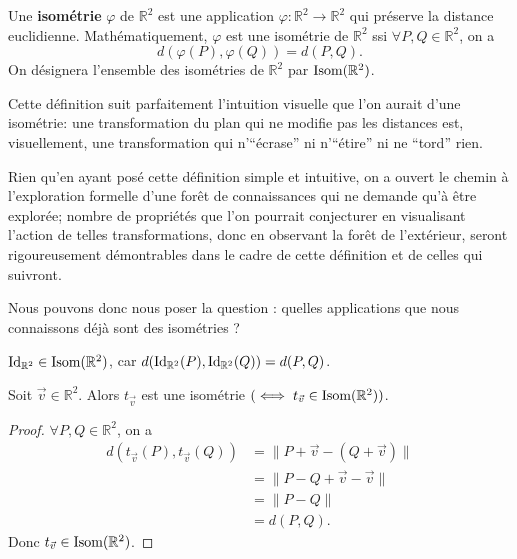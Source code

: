 \documentclass{book}
\numberwithin{equation}{section}
\renewcommand{\phi}{\varphi}
\providecommand{\plan}{{\mathbb R^2}}
\providecommand{\id}{{\textnormal{Id}}}
\providecommand{\IdR}{{\id_\plan}}
\providecommand{\isom}{{\textnormal{Isom}(\plan)}}
\providecommand{\trans}[1]{{t_{#1}}}
\providecommand{\longueur}[1]{{\lVert#1\rVert}}
\begin{document}
\begin{defn}
	Une \textbf{isométrie} $\phi$ de $\plan$ est une application $\phi : \plan \to \plan$ qui préserve la distance euclidienne. Mathématiquement, $\phi$ est une isométrie de $\plan$ ssi $\forall P, Q \in \plan$, on a 
	\begin{equation}
		d(\phi(P), \phi(Q)) = d(P, Q).
	\end{equation}
	On désignera l'ensemble des isométries de $\plan$ par $\isom$.
\end{defn}

Cette définition suit parfaitement l'intuition visuelle que l'on aurait d'une isométrie: une transformation du plan qui ne modifie pas les distances est, visuellement, une transformation qui n'``écrase'' ni n'``étire'' ni ne ``tord'' rien.\par
Rien qu'en ayant posé cette définition simple et intuitive, on a ouvert le chemin à l'exploration formelle d'une forêt de connaissances qui ne demande qu'à être explorée; nombre de propriétés que l'on pourrait conjecturer en visualisant l'action de telles transformations, donc en observant la forêt de l'extérieur, seront rigoureusement démontrables dans le cadre de cette définition et de celles qui suivront.\par
Nous pouvons donc nous poser la question : quelles applications que nous connaissons déjà sont des isométries ?

\begin{exmp}
	$\IdR \in \isom$, car $d(\IdR(P), \IdR(Q)) = d(P, Q)$.
\end{exmp}

\begin{prop}
	Soit $\vec v \in \plan$. Alors $\trans{\vec v}$ est une isométrie $( \iff \trans{\vec v} \in \isom)$.
\end{prop}
\begin{proof}
	$\forall P, Q \in \plan$, on a
	\begin{align*}
		d(\trans{\vec v}(P), \trans{\vec v}(Q)) &= \longueur{P + \vec v - (Q + \vec v)}\\
		&= \longueur{P - Q + \vec v - \vec v}\\
		&= \longueur{P - Q}\\
		&= d(P, Q).
	\end{align*}
	Donc $\trans{\vec v} \in \isom$.
\end{proof}
\end{document}
